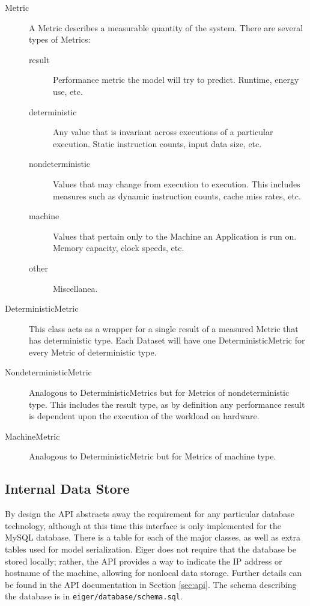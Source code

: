 \begin{description}
\item[Metric] A Metric describes a measurable quantity of the system. 
There are several types of Metrics:
	\begin{description}
	\item[result] Performance metric the model will try to predict.  Runtime,
		energy use, etc.
	\item[deterministic] Any value that is invariant across executions of a
		particular execution. Static instruction counts, input 
		data size, etc.
	\item[nondeterministic] Values that may change from execution to execution.
		This includes measures such as dynamic instruction counts, cache miss
		rates, etc.
	\item[machine] Values that pertain only to the Machine an Application is run
		on. Memory capacity, clock speeds, etc.
	\item[other] Miscellanea. 
	\end{description}

\item[DeterministicMetric] This class acts as a wrapper for a single result of a
measured Metric that has deterministic type. Each Dataset will have one
DeterministicMetric for every Metric of deterministic type.

\item[NondeterministicMetric] Analogous to DeterministicMetrics but for Metrics
of nondeterministic type. This includes the result type, as by definition
any performance result is dependent upon the execution of the workload on
hardware.

\item[MachineMetric] Analogous to DeterministicMetric but for Metrics of machine
type. 
\end{description}

\subsection{Internal Data Store}
By design the API abstracts away the requirement for any particular
database technology, although at this time this interface is only
implemented for the MySQL database. There is a table for each of the major
classes, as well as extra tables used for model serialization. Eiger does
not require that the database be stored locally; rather, the API provides a
way to indicate the IP address or hostname of the machine, allowing for
nonlocal data storage.  Further details can be found in the API
documentation in Section \ref{sec:api}. The schema describing the database is in
\texttt{eiger/database/schema.sql}. 

